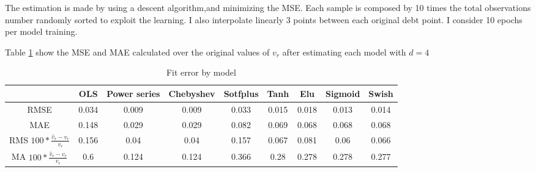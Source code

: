 \documentclass[12pt, a4paper]{article}
\begin{document}
\begin{enumerate}
	The estimation is made by using a descent algorithm,and minimizing the MSE. Each sample is composed by 10 times the total observations number randomly sorted to exploit the learning. I also interpolate linearly 3 points between each original debt point. I consider 10 epochs per model training. 
\end{enumerate}
Table \ref{tab:1} show the MSE and MAE calculated  over the original values of $v_r$ after estimating each model with $d=4$\\
\begin{table}[!hbt]
	\centering
	\caption{Fit error by model}
	\vspace{3mm}
	\begin{tabular}{|c|cccccccc|}
		\hline
		   & OLS&Power series& Chebyshev&Sotfplus&Tanh&Elu&Sigmoid&Swish\\
		\hline
		RMSE&  0.034 & 0.009 & 0.009 & 0.033 & 0.015 & 0.018 & 0.013 & 0.014 \\
		MAE&  0.148 & 0.029 & 0.029 & 0.082 & 0.069 & 0.068 & 0.068 & 0.068\\
		RMS $100*$ &0.156 & 0.04 &  0.04 &  0.157 & 0.067  &0.081 & 0.06   &0.066\\
		MA  $100*$ &0.6   & 0.124 & 0.124 & 0.366  &0.28   &0.278  &0.278  &0.277\\
		\hline
	\end{tabular}
	\label{tab:1}
\end{table}
\end{document}
